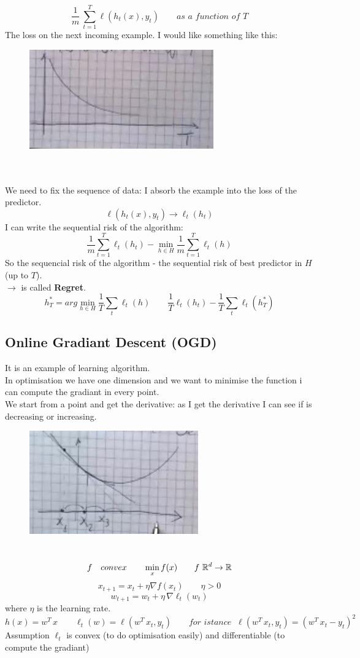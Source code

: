 \documentclass[../main.tex]{subfiles}
\begin{document}
$$
\frac{1}{m} \ \sum_{t=1}^{T} \ell(h_t(x), y_t) \qquad \textit{as a function of T}
$$
The loss on the next incoming example. 
\newpage
 I would like something like this: 
\begin{figure}[h]
    \centering
    \includegraphics[width=0.3\linewidth]{../img/lez14-img3.JPG}
    \caption{}
\end{figure}\\\\
We need to fix the sequence of data: I absorb the example into the loss of the predictor.
$$
\ell(h_t(x), y_t) \longrightarrow \ell_t(h_t)
$$
I can write the sequential risk of the algorithm:
$$
\frac{1}{m} \sum_{t=1}^{T} \ell_t(h_t) - \min_{h \in H} \frac{1}{m} \sum_{t=1}^{T} \ell_t(h) 
$$
So the sequencial risk of the algorithm - the sequential risk of best predictor in $H$ (up to $T$).
\\
 $\longrightarrow$ is called \textbf{Regret}.
\\

$$
h^*_T = arg \min_{h \in H} \frac{1}{T} \sum_{t} \ell_t(h) \qquad \frac{1}{T} \ell_t(h_t) - \frac{1}{T} \sum_t \ell_t(h_T^*)
$$
\newpage
\subsection{Online Gradiant Descent (OGD)}
It is an example of learning algorithm. \\
In optimisation we have one dimension and we want to minimise the function i can compute the gradiant in every point. \\
We start from a point and get the derivative: as I get the derivative I can see if is decreasing or increasing.\\
\begin{figure}[h]
    \centering
    \includegraphics[width=0.3\linewidth]{../img/lez14-img4.JPG}
    \caption{}
\end{figure}\\

$$
f \quad convex \qquad \min_x f(x) \qquad f \ \mathbb{R}^d \rightarrow \mathbb{R}
$$
$$
x_{t+1} = x_t + \eta \nabla f(x_t)  \qquad \eta > 0
$$
$$
w_{t+1} =  w_t + \eta \, \nabla \ell_t(w_t)
$$
where $\eta$ is the learning rate.
$$
h(x) = w^T \, x \qquad \ell_t(w) = \ell( w^T \, x_t, y_t) \qquad \textit{for istance } \ \ell(w^T \, x_t, y_t) = (w^T \, x_t - y_t)^2
$$
Assumption $\ell_t$ is convex (to do optimisation easily) and differentiable (to compute the gradiant)
\end{document}
